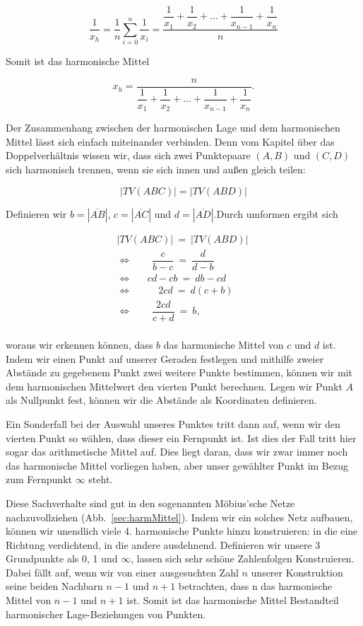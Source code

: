 \documentclass[12pt,a4paper]{article}
\begin{document}
\[ \dfrac{1}{x_h} = \dfrac{1}{n} \sum_{i=0}^n \dfrac{1}{x_i} = \dfrac{\dfrac{1}{x_1} + \dfrac{1}{x_2} + \dots + \dfrac{1}{x_{n-1}} + \dfrac{1}{x_n}}{n}\]

Somit ist das harmonische Mittel

\[ x_h = \dfrac{n}{\dfrac{1}{x_1} + \dfrac{1}{x_2} + \dots + \dfrac{1}{x_{n-1}} + \dfrac{1}{x_n}}.\]

Der Zusammenhang zwischen der harmonischen Lage und dem harmonischen Mittel lässt sich einfach miteinander verbinden. Denn vom Kapitel über das Doppelverhältnis wissen wir, dass sich zwei Punktepaare $(A, B)$ und $(C, D)$ sich harmonisch trennen, wenn sie sich innen und außen gleich teilen:

\[|TV(A B C)| = |TV(A B D)|\]

Definieren wir $b = |\overline{A B}|$, $c = |\overline{A C}|$ und $d = |\overline{A D}|$.Durch umformen ergibt sich

\begin{equation*}
\begin{split}
|TV(A B C)|~=~|TV(A B D)| ~\\
\Longleftrightarrow ~~~~~~~~~\dfrac{c}{b-c}~=~\dfrac{d}{d-b}~~~~~~~~~~\\
\Longleftrightarrow ~~~~~~~cd-cb~=~db-cd~~~~~~~~\\
\Longleftrightarrow ~~~~~~~~~~~~2 cd~=~d (c+b)~~~~~~~\\
\Longleftrightarrow ~~~~~~~~~\dfrac{2cd}{c+d}~=~b,~~~~~~~~~~~~~~~\\
\end{split}
\end{equation*}

woraus wir erkennen können, dass $b$ das harmonische Mittel von $c$ und $d$ ist. Indem wir einen Punkt auf unserer Geraden festlegen und mithilfe zweier Abstände zu gegebenem Punkt zwei weitere Punkte bestimmen, können wir mit dem harmonischen Mittelwert den vierten Punkt berechnen. Legen wir Punkt $A$ als Nullpunkt fest, können wir die Abstände als Koordinaten definieren.

Ein Sonderfall bei der Auswahl unseres Punktes tritt dann auf, wenn wir den vierten Punkt so wählen, dass dieser ein Fernpunkt ist. Ist dies der Fall tritt hier sogar das arithmetische Mittel auf. Dies liegt daran, dass wir zwar immer noch das harmonische Mittel vorliegen haben, aber unser gewählter Punkt im Bezug zum Fernpunkt $\infty$ steht.

Diese Sachverhalte sind gut in den sogenannten Möbius'sche Netze nachzuvollziehen (Abb.~\ref{sec:harmMittel}). Indem wir ein solches Netz aufbauen, können wir unendlich viele 4. harmonische Punkte hinzu konstruieren: in die eine Richtung verdichtend, in die andere ausdehnend. Definieren wir unsere 3 Grundpunkte als 0, 1 und $\infty$, lassen sich sehr schöne Zahlenfolgen Konstruieren. Dabei fällt auf, wenn wir von einer ausgesuchten Zahl $n$ unserer Konstruktion seine beiden Nachbarn $n-1$ und $n+1$ betrachten, dass n das harmonische Mittel von $n-1$ und $n+1$ ist. Somit ist das harmonische Mittel Bestandteil harmonischer Lage-Beziehungen von Punkten.
\end{document}
